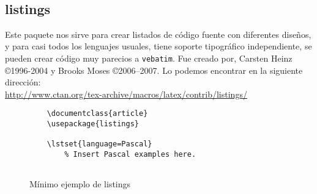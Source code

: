 		\begin{figure}[h]
		\begin{fblock}
			\noindent{}
			\noindent\makebox[\textwidth]\\
			\noindent{}
			\noindent\makebox[\textwidth]\\
			\noindent{}
			\noindent\makebox[\textwidth]\\
			\noindent{}
			\noindent\makebox[\textwidth]\\
			\noindent{}
			\noindent\makebox[\textwidth]\\
			\noindent\makebox[\textwidth]{\hfill\hfill}\\[\baselineskip]
			\noindent\makebox[\textwidth]
			\noindent\makebox[\textwidth]{\hfill
			\hfill }
		\end{fblock}
		\end{figure}
\subsection{listings}
Este paquete nos sirve para crear listados de código fuente con diferentes diseños, y para casi todos los lenguajes usuales, tiene soporte tipográfico independiente, se pueden  crear código muy parecios a \verb|vebatim|.
Fue creado por,  Carsten Heinz \copyright 1996-2004 y Brooks Moses \copyright 2006–2007.
Lo podemos encontrar en la siguiente dirección:\\
\url{http://www.ctan.org/tex-archive/macros/latex/contrib/listings/}

\begin{figure}[htb]	
\begin{verbatim}
	\documentclass{article}
	\usepackage{listings}
	
	\lstset{language=Pascal}
		% Insert Pascal examples here.
	
\end{verbatim}
\caption{M\'inimo ejemplo de listings}
\end{figure}

